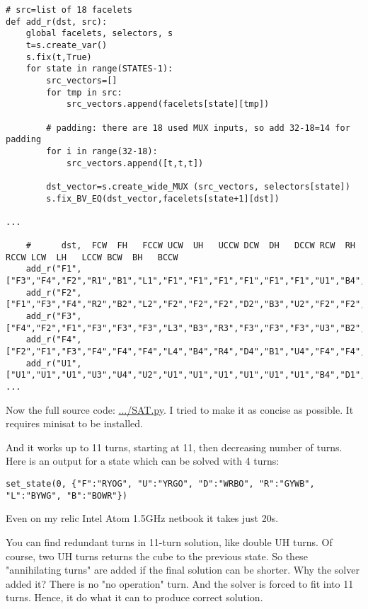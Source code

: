 \begin{lstlisting}
# src=list of 18 facelets
def add_r(dst, src):
    global facelets, selectors, s
    t=s.create_var()
    s.fix(t,True)
    for state in range(STATES-1):
        src_vectors=[]
        for tmp in src:
            src_vectors.append(facelets[state][tmp])

        # padding: there are 18 used MUX inputs, so add 32-18=14 for padding
        for i in range(32-18): 
            src_vectors.append([t,t,t])

        dst_vector=s.create_wide_MUX (src_vectors, selectors[state])
        s.fix_BV_EQ(dst_vector,facelets[state+1][dst])

...

    #      dst,  FCW  FH   FCCW UCW  UH   UCCW DCW  DH   DCCW RCW  RH   RCCW LCW  LH   LCCW BCW  BH   BCCW
    add_r("F1",["F3","F4","F2","R1","B1","L1","F1","F1","F1","F1","F1","F1","U1","B4","D1","F1","F1","F1"])
    add_r("F2",["F1","F3","F4","R2","B2","L2","F2","F2","F2","D2","B3","U2","F2","F2","F2","F2","F2","F2"])
    add_r("F3",["F4","F2","F1","F3","F3","F3","L3","B3","R3","F3","F3","F3","U3","B2","D3","F3","F3","F3"])
    add_r("F4",["F2","F1","F3","F4","F4","F4","L4","B4","R4","D4","B1","U4","F4","F4","F4","F4","F4","F4"])
    add_r("U1",["U1","U1","U1","U3","U4","U2","U1","U1","U1","U1","U1","U1","B4","D1","F1","R2","D4","L3"])
...
\end{lstlisting}

Now the full source code: \url{.../SAT.py}.
I tried to make it as concise as possible.
It requires minisat to be installed.

And it works up to 11 turns, starting at 11, then decreasing number of turns.
Here is an output for a state which can be solved with 4 turns:

\begin{lstlisting}
set_state(0, {"F":"RYOG", "U":"YRGO", "D":"WRBO", "R":"GYWB", "L":"BYWG", "B":"BOWR"})
\end{lstlisting}



Even on my relic Intel Atom 1.5GHz netbook it takes just 20s.

You can find redundant turns in 11-turn solution, like double UH turns.
Of course, two UH turns returns the cube to the previous state.
So these "annihilating turns" are added if the final solution can be shorter.
Why the solver added it? There is no "no operation" turn. And the solver is forced to fit into 11 turns.
Hence, it do what it can to produce correct solution.

